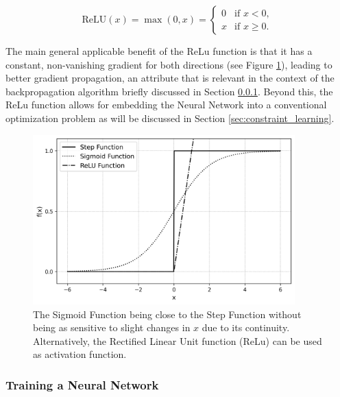 \[
\text{ReLU}(x) = \max(0, x) = 
\begin{cases}
	0 & \text{if } x < 0, \\
	x & \text{if } x \geq 0.
\end{cases}
\]
 
 The main general applicable benefit of the ReLu function is that it has a constant, non-vanishing gradient for both directions (see Figure \ref{fig:activation_functions}), leading to better gradient propagation, an attribute that is relevant in the context of the backpropagation algorithm briefly discussed in Section \ref{subsubsec:training_nn}. \cite{preprintReLuGlorot}
 Beyond this, the ReLu function allows for embedding the Neural Network into a conventional optimization problem as will be discussed in Section \ref{sec:constraint_learning}.

\begin{figure}[h] 
	\centering
	\includegraphics[width=0.9\textwidth]{figures/modelling/activation_functions.png} %
	\caption{The Sigmoid Function being close to the Step Function without being as sensitive to slight changes in $x$ due to its continuity. Alternatively, the Rectified Linear Unit function (ReLu) can be used as activation function. }
	\label{fig:activation_functions}
\end{figure}

\cite{nielsen2015neuralChap1}


\subsubsection{Training a Neural Network} \label{subsubsec:training_nn}


